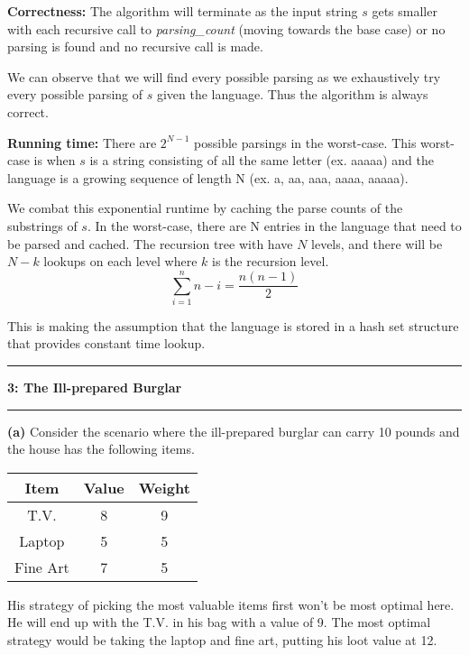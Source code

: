 \documentclass[11pt]{article}
\newcommand\question[2]{\vspace{.25in}\hrule\textbf{#1: #2}\vspace{.5em}\hrule\vspace{.10in}}
\renewcommand\part[1]{\vspace{.10in}\textbf{(#1)}}
\newcommand\correctness{\vspace{.10in}\textbf{Correctness: }}
\newcommand\runtime{\vspace{.10in}\textbf{Running time: }}
\begin{document}
\correctness The algorithm will terminate as the input string $s$ gets smaller with each recursive call to \textit{parsing\_count} (moving towards the base case) or no parsing is found and no recursive call is made.

We can observe that we will find every possible parsing as we exhaustively try every possible parsing of $s$ given the language. Thus the algorithm is always correct. 

\runtime There are $2^{N-1}$ possible parsings in the worst-case. This worst-case is when $s$ is a string consisting of all the same letter (ex. aaaaa) and the language is a growing sequence of length N (ex. a, aa, aaa, aaaa, aaaaa).

 We combat this exponential runtime by caching the parse counts of the substrings of $s$. In the worst-case, there are N entries in the language that need to be parsed and cached. The recursion tree with have $N$ levels, and there will be $N-k$ lookups on each level where $k$ is the recursion level. 
 $$\sum_{i=1}^{n} n-i = \frac{n(n-1)}{2}$$
 
 This is making the assumption that the language is stored in a hash set structure that provides constant time lookup.
 
 
\question{3}{The Ill-prepared Burglar}

\part{a} Consider the scenario where the ill-prepared burglar can carry 10 pounds and the house has the following items.

\begin{table}[H]
\centering
{\renewcommand{\arraystretch}{1.2}%
\begin{tabular}{| c | c | c |}
\hline
Item& Value& Weight\\
\hline
T.V. & 8& 9\\ \hline
Laptop & 5& 5\\ \hline
Fine Art & 7& 5\\ \hline
\end{tabular}}
\end{table}

His strategy of picking the most valuable items first won't be most optimal here. He will end up with the T.V. in his bag with a value of 9. The most optimal strategy would be taking the laptop and fine art, putting his loot value at 12.
\end{document}
